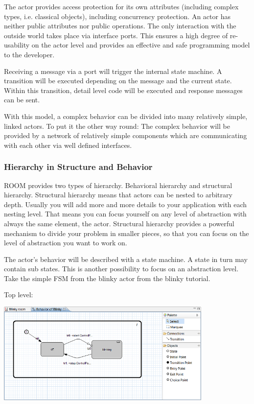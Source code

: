 The actor provides access protection for its own attributes (including complex types, i.e. classical objects), 
including concurrency protection. An actor has neither public attributes nor public operations. The only 
interaction with the outside world takes place via interface ports. This ensures a high degree of 
re-usability on the actor level and provides an effective and safe programming model to the developer. 

Receiving a message via a port will trigger the internal state machine. A transition will be executed 
depending on the message and the current state. Within this transition, detail level code will be executed 
and response messages can be sent.

With this model, a complex behavior can be divided into many relatively simple, linked actors. To put it the 
other way round: The complex behavior will be provided by a network of relatively simple components which 
are communicating with each other via well defined interfaces.


\subsubsection*{Hierarchy in Structure and Behavior}

ROOM provides two types of hierarchy. Behavioral hierarchy and structural hierarchy. Structural hierarchy 
means that actors can be nested to arbitrary depth. Usually you will add more and more details to your 
application with each nesting level. That means you can focus yourself on any level of abstraction with 
always the same element, the actor. Structural hierarchy provides a powerful mechanism to divide your 
problem in smaller pieces, so that you can focus on the level of abstraction you want to work on. 

The actor's behavior will be described with a state machine. A state in turn may contain sub states. This 
is another possibility to focus on an abstraction level. Take the simple FSM from the blinky actor from 
the blinky tutorial. 
   
Top level:

\includegraphics[width=0.8\textwidth]{images/020-Blinky15.png}

